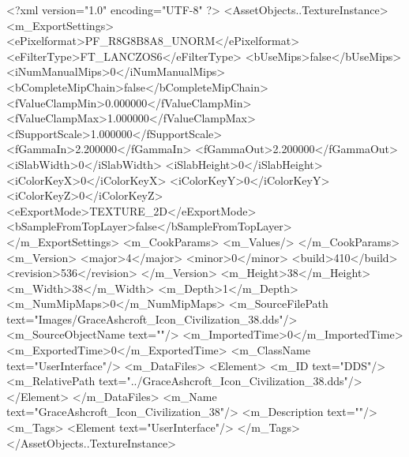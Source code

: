 <?xml version="1.0" encoding="UTF-8" ?>
<AssetObjects..TextureInstance>
	<m_ExportSettings>
		<ePixelformat>PF_R8G8B8A8_UNORM</ePixelformat>
		<eFilterType>FT_LANCZOS6</eFilterType>
		<bUseMips>false</bUseMips>
		<iNumManualMips>0</iNumManualMips>
		<bCompleteMipChain>false</bCompleteMipChain>
		<fValueClampMin>0.000000</fValueClampMin>
		<fValueClampMax>1.000000</fValueClampMax>
		<fSupportScale>1.000000</fSupportScale>
		<fGammaIn>2.200000</fGammaIn>
		<fGammaOut>2.200000</fGammaOut>
		<iSlabWidth>0</iSlabWidth>
		<iSlabHeight>0</iSlabHeight>
		<iColorKeyX>0</iColorKeyX>
		<iColorKeyY>0</iColorKeyY>
		<iColorKeyZ>0</iColorKeyZ>
		<eExportMode>TEXTURE_2D</eExportMode>
		<bSampleFromTopLayer>false</bSampleFromTopLayer>
	</m_ExportSettings>
	<m_CookParams>
		<m_Values/>
	</m_CookParams>
	<m_Version>
		<major>4</major>
		<minor>0</minor>
		<build>410</build>
		<revision>536</revision>
	</m_Version>
	<m_Height>38</m_Height>
	<m_Width>38</m_Width>
	<m_Depth>1</m_Depth>
	<m_NumMipMaps>0</m_NumMipMaps>
	<m_SourceFilePath text="Images/GraceAshcroft_Icon_Civilization_38.dds"/>
	<m_SourceObjectName text=""/>
	<m_ImportedTime>0</m_ImportedTime>
	<m_ExportedTime>0</m_ExportedTime>
	<m_ClassName text="UserInterface"/>
	<m_DataFiles>
		<Element>
			<m_ID text="DDS"/>
			<m_RelativePath text="../GraceAshcroft_Icon_Civilization_38.dds"/>
		</Element>
	</m_DataFiles>
	<m_Name text="GraceAshcroft_Icon_Civilization_38"/>
	<m_Description text=""/>
	<m_Tags>
		<Element text="UserInterface"/>
	</m_Tags>
</AssetObjects..TextureInstance>

